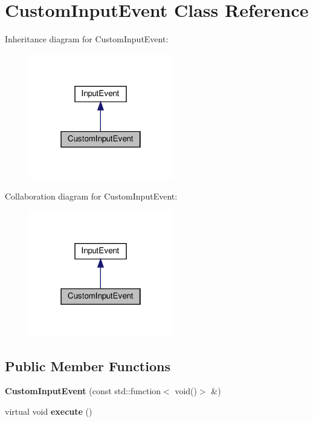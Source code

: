 \hypertarget{classCustomInputEvent}{}\section{Custom\+Input\+Event Class Reference}
\label{classCustomInputEvent}


Inheritance diagram for Custom\+Input\+Event\+:
\nopagebreak
\begin{figure}[H]
\begin{center}
\leavevmode
\includegraphics[width=178pt]{classCustomInputEvent__inherit__graph}
\end{center}
\end{figure}


Collaboration diagram for Custom\+Input\+Event\+:
\nopagebreak
\begin{figure}[H]
\begin{center}
\leavevmode
\includegraphics[width=178pt]{classCustomInputEvent__coll__graph}
\end{center}
\end{figure}
\subsection*{Public Member Functions}
\begin{DoxyCompactItemize}
\item 
\mbox{\label{classCustomInputEvent_aa1e4e3b365895df3239bd9ca61018fdb}} 
{\bfseries Custom\+Input\+Event} (const std\+::function$<$ void()$>$ \&)
\item 
\mbox{\label{classCustomInputEvent_a479cad3a50f0f7d58939f5f88b18f629}} 
virtual void {\bfseries execute} ()
\end{DoxyCompactItemize}


